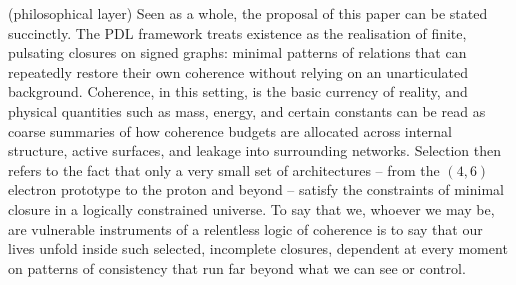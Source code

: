 \documentclass[11pt,a4paper]{article}
\theoremstyle{definition}
\begin{document}
(philosophical layer) Seen as a whole, the proposal of this paper can be stated succinctly. The PDL framework treats existence as the realisation of finite, pulsating closures on signed graphs: minimal patterns of relations that can repeatedly restore their own coherence without relying on an unarticulated background. Coherence, in this setting, is the basic currency of reality, and physical quantities such as mass, energy, and certain constants can be read as coarse summaries of how coherence budgets are allocated across internal structure, active surfaces, and leakage into surrounding networks. Selection then refers to the fact that only a very small set of architectures -- from the $(4,6)$ electron prototype to the proton and beyond -- satisfy the constraints of minimal closure in a logically constrained universe. To say that we, whoever we may be, are vulnerable instruments of a relentless logic of coherence is to say that our lives unfold inside such selected, incomplete closures, dependent at every moment on patterns of consistency that run far beyond what we can see or control.



\end{document}

